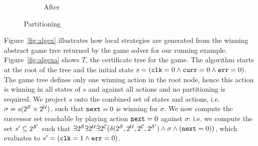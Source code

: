 \begin{figure}[b]
\begin{subfigure}[t]{.3\textwidth}
\begin{minipage}[t][3cm][t]{\textwidth}
        \end{minipage}
        \caption{After}
    \end{subfigure}%
    \hspace*{\fill}
    \caption{Partitioning}
    \label{fig:partition}
\end{figure}

Figure~\ref{fig:algex} illustrates how local strategies are generated from the winning abstract game tree returned by the game solver for our running example.  Figure~\ref{fig:algexa} shows $T$, the certificate tree for the game. The algorithm starts at the root of the tree and the initial state $s = (\texttt{clk} = 0 \land \texttt{curr} = 0 \land \texttt{err} = 0)$.  The game tree defines only one winning action in the root node, hence this action is winning in all states of $s$ and against all actions and no partitioning is required. We project $s$ onto the combined set of states and actions, i.e. $\sigma = s(2^{\mathcal{S}} \times 2^{\mathcal{U}})$, such that $\texttt{next} = 0$ is winning for $\sigma$. We now compute the successor set reachable by playing action $\texttt{next} = 0$ against $\sigma$: i.e. we compute the set $s' \subseteq 2^{\mathcal{S}'}$ such that $\exists 2^{\mathcal{S}} \exists 2^{\mathcal{U}} \exists 2^{\mathcal{C}} (\delta(2^{\mathcal{S}}, 2^{\mathcal{U}}, 2^{\mathcal{C}}, 2^{\mathcal{S}'}) \land \sigma \land (\texttt{next} = 0))$, which evaluates to $s' = (\texttt{clk} = 1 \land \texttt{err} = 0)$.

